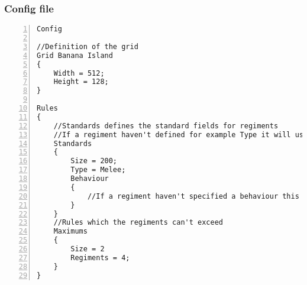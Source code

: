 		\subsubsection{Config file}
					\begin{lstlisting}[basicstyle=\small\sffamily,
					keywords={break,case,const,continue,default,else,enum,
					for,if,return,switch,while,do,long,void,int,float,double,
					char,struct,typedef,include,size\_t},
					keywordstyle={\color{blue}},
					comment={[l]{//}}, morecomment={[s]{/*}{*/}}, commentstyle=\itshape,
					columns={[l]flexible}, numbers=left, numberstyle=\tiny,
					frameround=fftt, frame=shadowbox, captionpos=b,
					caption={Config file of the code example 3},
					label=LST:code32]
Config

//Definition of the grid
Grid Banana Island
{
	Width = 512;
	Height = 128;
}

Rules
{
	//Standards defines the standard fields for regiments
	//If a regiment haven't defined for example Type it will use the Type in Standards
	Standards
	{
		Size = 200;
		Type = Melee;
		Behaviour
		{
			//If a regiment haven't specified a behaviour this behaviour will be used.
		}
	}
	//Rules which the regiments can't exceed
	Maximums
	{
		Size = 2
		Regiments = 4;
	}
}
\end{lstlisting}				